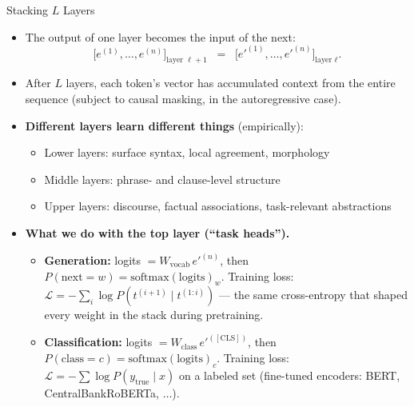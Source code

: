 \begin{frame}{Stacking $L$ Layers}
\begin{itemize}
\item The output of one layer becomes the input of the next:
\[
   \bigl[e^{(1)}, \ldots, e^{(n)}\bigr]_{\text{layer } \ell + 1}
   \;\;=\;\;
   \bigl[e'^{(1)}, \ldots, e'^{(n)}\bigr]_{\text{layer } \ell}.
\]

\medskip
\item After $L$ layers, each token's vector has accumulated context from the entire sequence (subject to causal masking, in the autoregressive case).

\medskip
\item \textbf{Different layers learn different things} (empirically):
\begin{itemize}
    \item Lower layers: surface syntax, local agreement, morphology
    \item Middle layers: phrase- and clause-level structure
    \item Upper layers: discourse, factual associations, task-relevant abstractions
\end{itemize}

\medskip
\item \textbf{What we do with the top layer (``task heads'').}
\begin{itemize}
    \item \textbf{Generation:} logits $= W_{\text{vocab}}\, e'^{(n)}$, then $P(\text{next}=w) = \mathrm{softmax}(\text{logits})_{w}$. Training loss: $\mathcal{L} = -\sum_{i} \log P(t^{(i+1)} \mid t^{(1:i)})$ --- the same cross-entropy that shaped every weight in the stack during pretraining.
    \item \textbf{Classification:} logits $= W_{\text{class}}\, e'^{([\text{CLS}])}$, then $P(\text{class}=c) = \mathrm{softmax}(\text{logits})_{c}$. Training loss: $\mathcal{L} = -\sum \log P(y_{\text{true}} \mid x)$ on a labeled set (fine-tuned encoders: BERT, CentralBankRoBERTa, $\ldots$).
\end{itemize}
\end{itemize}
\end{frame}

